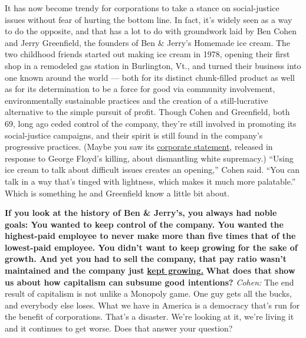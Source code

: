 It has now become trendy for corporations to take a stance on
social-justice issues without fear of hurting the bottom line. In fact,
it's widely seen as a way to do the opposite, and that has a lot to do
with groundwork laid by Ben Cohen and Jerry Greenfield, the founders of
Ben \& Jerry's Homemade ice cream. The two childhood friends started out
making ice cream in 1978, opening their first shop in a remodeled gas
station in Burlington, Vt., and turned their business into one known
around the world --- both for its distinct chunk-filled product as well
as for its determination to be a force for good via community
involvement, environmentally sustainable practices and the creation of a
still-lucrative alternative to the simple pursuit of profit. Though
Cohen and Greenfield, both 69, long ago ceded control of the company,
they're still involved in promoting its social-justice campaigns, and
their spirit is still found in the company's progressive practices.
(Maybe you saw its
\href{https://www.benjerry.com/about-us/media-center/dismantle-white-supremacy}{corporate
statement}, released in response to George Floyd's killing, about
dismantling white supremacy.) ``Using ice cream to talk about difficult
issues creates an opening,'' Cohen said. ``You can talk in a way that's
tinged with lightness, which makes it much more palatable.'' Which is
something he and Greenfield know a little bit about.

\textbf{If you look at the history of Ben \& Jerry's, you always had
noble goals: You wanted to keep control of the company. You wanted the
highest-paid employee to never make more than five times that of the
lowest-paid employee. You didn't want to keep growing for the sake of
growth. And yet you had to sell the company, that pay ratio wasn't
maintained and the company just}
\textbf{\href{http://nytimes3xbfgragh.onion\#tooltip-1}{kept growing.}}
\textbf{What does that show us about how capitalism can subsume good
intentions?} \emph{Cohen:} The end result of capitalism is not unlike a
Monopoly game. One guy gets all the bucks, and everybody else loses.
What we have in America is a democracy that's run for the benefit of
corporations. That's a disaster. We're looking at it, we're living it
and it continues to get worse. Does that answer your question?

